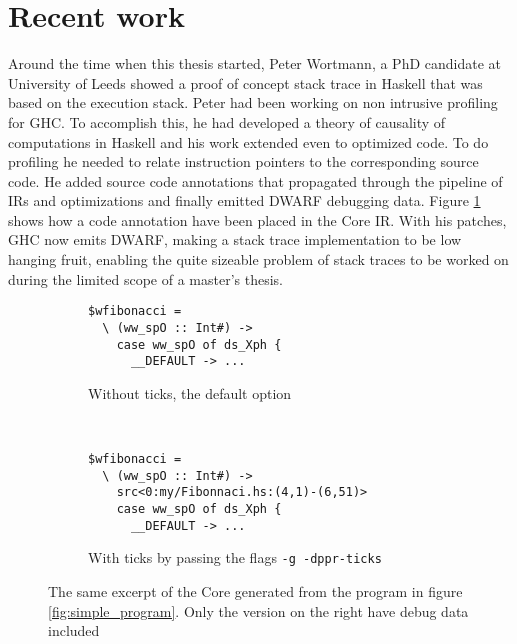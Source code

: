\section{Recent work} \label{sec:recent_work}

Around the time when this thesis started, Peter Wortmann, a
PhD candidate at University of Leeds showed a proof of concept
stack trace in Haskell that was based on the execution stack.
\cite{stack_traces_ticket} Peter had been working on non intrusive
profiling for GHC. To accomplish this, he had developed a theory of
causality of computations in Haskell and his work extended even to
optimized code. \cite{DBLP:conf/haskell/WortmannD13} To do profiling
he needed to relate instruction pointers to the corresponding source
code. He added source code annotations that propagated
through the pipeline of IRs and optimizations and finally emitted DWARF
debugging data. Figure \ref{fig:core_and_ticks} shows how a code
annotation have been placed in the Core IR. With his patches, GHC now
emits DWARF, making a stack trace implementation to be low hanging
fruit, enabling the quite sizeable problem of stack traces to be worked
on during the limited scope of a master's thesis.

\begin{figure}
\begin{mdframed}
        \begin{subfigure}[t]{0.4\textwidth}
            \begin{verbatim}
$wfibonacci =
  \ (ww_spO :: Int#) ->
    case ww_spO of ds_Xph {
      __DEFAULT -> ...
            \end{verbatim}
            \caption{Without ticks, the default option}
        \end{subfigure}
        ~ %
        \begin{subfigure}[t]{0.6\textwidth}
          \begin{verbatim}
$wfibonacci =
  \ (ww_spO :: Int#) ->
    src<0:my/Fibonnaci.hs:(4,1)-(6,51)>
    case ww_spO of ds_Xph {
      __DEFAULT -> ...
          \end{verbatim}
          \caption{With ticks by passing the flags \texttt{-g -dppr-ticks}}
        \end{subfigure}
        \caption{The same excerpt of the Core generated from the program
in figure \ref{fig:simple_program}. Only the version on the right have
debug data included }\label{fig:core_and_ticks}
\end{mdframed}
\end{figure}

